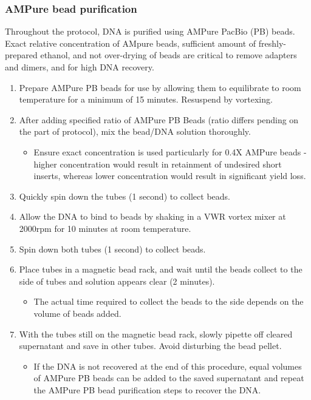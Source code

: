 \subsubsection{AMPure bead purification}
\label{proto: ampure}
Throughout the protocol, DNA is purified using AMPure PacBio (PB) beads. Exact relative concentration of AMpure beads, sufficient amount of freshly-prepared ethanol, and not over-drying of beads are critical to remove adapters and dimers, and for high DNA recovery.   
\label{general_ampure_bead_purification}
\begin{enumerate}
	\item Prepare AMPure PB beads for use by allowing them to equilibrate to room temperature for a minimum of 15 minutes. Resuspend by vortexing.
	\item After adding specified ratio of AMPure PB Beads (ratio differs pending on the part of protocol), mix the bead/DNA solution thoroughly.
	\begin{itemize}
		\item Ensure exact concentration is used particularly for 0.4X AMPure beads - higher concentration would result in retainment of undesired short inserts, whereas lower concentration would result in significant yield loss. 
	\end{itemize} 
	\item Quickly spin down the tubes (1 second) to collect beads. 
	\item Allow the DNA to bind to beads by shaking in a VWR vortex mixer at 2000rpm for 10 minutes at room temperature. 
	\item Spin down both tubes (1 second) to collect beads. 
	\item Place tubes in a magnetic bead rack, and wait until the beads collect to the side of tubes and solution appears clear (2 minutes).
	\begin{itemize}
		\item The actual time required to collect the beads to the side depends on the volume of beads added.
	\end{itemize} 
	\item With the tubes still on the magnetic bead rack, slowly pipette off cleared supernatant and save in other tubes. Avoid disturbing the bead pellet.
		\begin{itemize}
		\item If the DNA is not recovered at the end of this procedure, equal volumes of AMPure PB beads can be added to the saved supernatant and repeat the AMPure PB bead purification steps to recover the DNA.

\end{itemize}
\end{enumerate}

